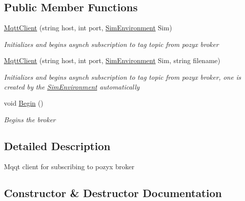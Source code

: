 \subsection*{Public Member Functions}
\begin{DoxyCompactItemize}
\item 
\hyperlink{class_pozyx_positioner_1_1_framework_1_1_mqtt_client_a4e2ab3ac03e686e3b85fe50d1a02feb8}{Mqtt\+Client} (string host, int port, \hyperlink{class_pozyx_positioner_1_1_framework_1_1_sim_environment}{Sim\+Environment} Sim)
\begin{DoxyCompactList}\small\item\em Initializes and begins asynch subscription to tag topic from pozyx broker \end{DoxyCompactList}\item 
\hyperlink{class_pozyx_positioner_1_1_framework_1_1_mqtt_client_aed3db79610eeaa328698f435c519c791}{Mqtt\+Client} (string host, int port, \hyperlink{class_pozyx_positioner_1_1_framework_1_1_sim_environment}{Sim\+Environment} Sim, string filename)
\begin{DoxyCompactList}\small\item\em Initializes and begins asynch subscription to tag topic from pozyx broker, one is created by the \hyperlink{class_pozyx_positioner_1_1_framework_1_1_sim_environment}{Sim\+Environment} automatically \end{DoxyCompactList}\item 
void \hyperlink{class_pozyx_positioner_1_1_framework_1_1_mqtt_client_aa08cbaf1de4adeae85b39edc92791ab9}{Begin} ()
\begin{DoxyCompactList}\small\item\em Begins the broker \end{DoxyCompactList}\end{DoxyCompactItemize}


\subsection{Detailed Description}
Mqqt client for subscribing to pozyx broker 



\subsection{Constructor \& Destructor Documentation}
\mbox{\label{class_pozyx_positioner_1_1_framework_1_1_mqtt_client_a4e2ab3ac03e686e3b85fe50d1a02feb8}} 
